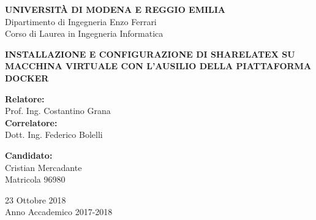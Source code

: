 \thispagestyle{empty}
\vspace*{-1. cm}
\begin{center}
  \Large
  \textbf{UNIVERSIT\`A DI MODENA E REGGIO EMILIA}\\
  
  \vspace{0.25 cm}
  \Large
  Dipartimento di Ingegneria Enzo Ferrari\\
  Corso di Laurea in Ingegneria Informatica\\
  \vspace*{5. cm} \LARGE

  \textbf{INSTALLAZIONE E CONFIGURAZIONE DI SHARELATEX SU MACCHINA VIRTUALE CON L'AUSILIO DELLA PIATTAFORMA DOCKER}\\
  
\end{center}

\vspace*{2.5 cm}
\Large

\begin{flushleft}
  \textbf{Relatore:}\\
  Prof. Ing. Costantino Grana\\
  \vspace*{0.25 cm}
  \textbf{Correlatore:}\\
  Dott. Ing. Federico Bolelli 
\end{flushleft}

\vspace*{0.5 cm}

\begin{flushright}
  \textbf{Candidato:}\\
  Cristian Mercadante\\
  Matricola 96980
\end{flushright}

\vspace*{2.25 cm}

\begin{center}
  23 Ottobre 2018\\
  Anno Accademico 2017-2018
\end{center} \clearpage
\normalsize

